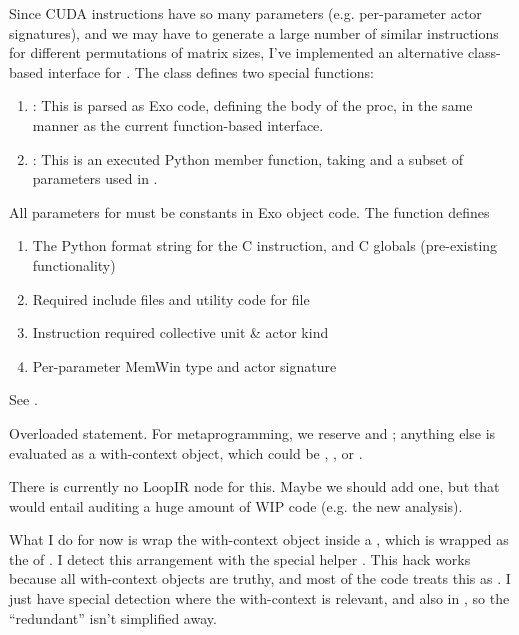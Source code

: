 \filbreak
{} Since CUDA instructions have so many parameters (e.g. per-parameter actor signatures), and we may have to generate a large number of similar instructions for different permutations of matrix sizes, I've implemented an alternative class-based interface for .
The class defines two special functions:
\begin{enumerate}
  \item {}: This is parsed as Exo code, defining the body of the  proc, in the same manner as the current function-based  interface.
  \filbreak
  \item {}: This is an executed Python member function, taking  and a subset of parameters used in .
\end{enumerate}

\filbreak
All parameters for  must be constants in Exo object code.
The  function defines
\begin{enumerate}
  \item The Python format string for the C instruction, and C globals (pre-existing  functionality)
  \filbreak
  \item Required include files and utility code for  file
  \filbreak
  \item Instruction required collective unit \& actor kind
  \filbreak
  \item Per-parameter MemWin type and actor signature
\end{enumerate}

\filbreak
See .

\filbreak
{} Overloaded  statement.
For metaprogramming, we reserve  and ;
anything else is evaluated as a with-context object, which could be , , or .

\filbreak
There is currently no LoopIR node for this.
Maybe we should add one, but that would entail auditing a huge amount of WIP code (e.g. the new analysis).

\filbreak
What I do for now is wrap the with-context object inside a , which is wrapped as the  of .
I detect this arrangement with the special helper .
This hack works because all with-context objects are truthy, and most of the code treats this as .
I just have special detection where the with-context is relevant, and also in , so the ``redundant''  isn't simplified away.

